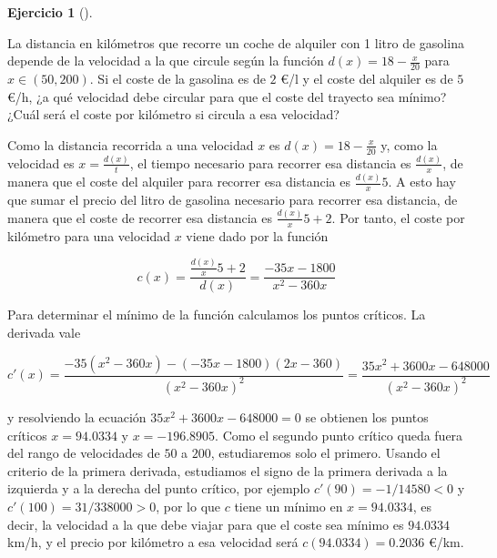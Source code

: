 \documentclass[
  spanish,
  a4paper,
]{scrreport}
\theoremstyle{definition}
\newtheorem{exercise}{Ejercicio}[chapter]
\theoremstyle{remark}
\begin{document}
\begin{exercise}[]\protect\hypertarget{exr-extremos-9}{}\label{exr-extremos-9}

La distancia en kilómetros que recorre un coche de alquiler con 1 litro
de gasolina depende de la velocidad a la que circule según la función
\(d(x)=18-\frac{x}{20}\) para \(x\in(50,200)\). Si el coste de la
gasolina es de \(2\) €/l y el coste del alquiler es de \(5\) €/h, ¿a qué
velocidad debe circular para que el coste del trayecto sea mínimo? ¿Cuál
será el coste por kilómetro si circula a esa velocidad?

\end{exercise}

\begin{tcolorbox}[enhanced jigsaw, arc=.35mm, bottomrule=.15mm, bottomtitle=1mm, breakable, colback=white, colbacktitle=quarto-callout-tip-color!10!white, colframe=quarto-callout-tip-color-frame, coltitle=black, left=2mm, leftrule=.75mm, opacityback=0, opacitybacktitle=0.6, rightrule=.15mm, title=\textcolor{quarto-callout-tip-color}{\faLightbulb}\hspace{0.5em}{Solución}, titlerule=0mm, toprule=.15mm, toptitle=1mm]

Como la distancia recorrida a una velocidad \(x\) es
\(d(x)=18-\frac{x}{20}\) y, como la velocidad es \(x=\frac{d(x)}{t}\),
el tiempo necesario para recorrer esa distancia es \(\frac{d(x)}{x}\),
de manera que el coste del alquiler para recorrer esa distancia es
\(\frac{d(x)}{x}5\). A esto hay que sumar el precio del litro de
gasolina necesario para recorrer esa distancia, de manera que el coste
de recorrer esa distancia es \(\frac{d(x)}{x}5+2\). Por tanto, el coste
por kilómetro para una velocidad \(x\) viene dado por la función

\[
c(x)=\frac{\frac{d(x)}{x}5+2}{d(x)} = \frac{-35x-1800}{x^2-360x}
\]

Para determinar el mínimo de la función calculamos los puntos críticos.
La derivada vale

\[
c'(x)
=\frac{-35(x^2-360x)-(-35x-1800)(2x-360)}{(x^2-360x)^2}
=\frac{35x^2+3600x-648000}{(x^2-360x)^2}
\]

y resolviendo la ecuación \(35x^2+3600x-648000=0\) se obtienen los
puntos críticos \(x=94.0334\) y \(x=-196.8905\). Como el segundo punto
crítico queda fuera del rango de velocidades de \(50\) a \(200\),
estudiaremos solo el primero. Usando el criterio de la primera derivada,
estudiamos el signo de la primera derivada a la izquierda y a la derecha
del punto crítico, por ejemplo \(c'(90)=-1/14580<0\) y
\(c'(100)=31/338000>0\), por lo que \(c\) tiene un mínimo en
\(x=94.0334\), es decir, la velocidad a la que debe viajar para que el
coste sea mínimo es \(94.0334\) km/h, y el precio por kilómetro a esa
velocidad será \(c(94.0334)=0.2036\) €/km.

\end{tcolorbox}
\end{document}
